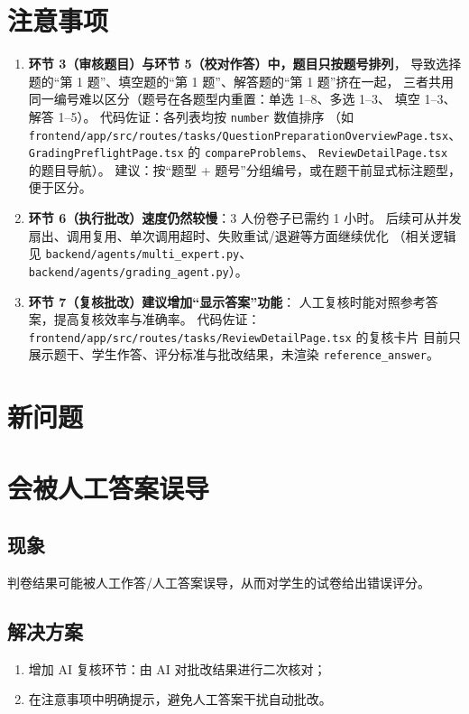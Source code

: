 \documentclass[12pt,a4paper]{ctexart}
\begin{document}
\section*{注意事项}

\begin{enumerate}[leftmargin=2em,label=\arabic*.]
  \item \textbf{环节 3（审核题目）与环节 5（校对作答）中，题目只按题号排列}，
        导致选择题的“第 1 题”、填空题的“第 1 题”、解答题的“第 1 题”挤在一起，
        三者共用同一编号难以区分（题号在各题型内重置：单选 1--8、多选 1--3、
        填空 1--3、解答 1--5）。
        代码佐证：各列表均按 \texttt{number} 数值排序
        （如 \texttt{frontend/app/src/routes/tasks/QuestionPreparationOverviewPage.tsx}、
        \texttt{GradingPreflightPage.tsx} 的 \texttt{compareProblems}、
        \texttt{ReviewDetailPage.tsx} 的题目导航）。
        建议：按“题型 + 题号”分组编号，或在题干前显式标注题型，便于区分。

  \item \textbf{环节 6（执行批改）速度仍然较慢}：3 人份卷子已需约 1 小时。
        后续可从并发扇出、调用复用、单次调用超时、失败重试/退避等方面继续优化
        （相关逻辑见 \texttt{backend/agents/multi\_expert.py}、
        \texttt{backend/agents/grading\_agent.py}）。

  \item \textbf{环节 7（复核批改）建议增加“显示答案”功能}：
        人工复核时能对照参考答案，提高复核效率与准确率。
        代码佐证：\texttt{frontend/app/src/routes/tasks/ReviewDetailPage.tsx} 的复核卡片
        目前只展示题干、学生作答、评分标准与批改结果，未渲染
        \texttt{reference\_answer}。
\end{enumerate}

\section*{新问题}

\section{会被人工答案误导}

\subsection{现象}
判卷结果可能被人工作答/人工答案误导，从而对学生的试卷给出错误评分。

\subsection{解决方案}
\begin{enumerate}[leftmargin=2em,label=(\arabic*)]
  \item 增加 AI 复核环节：由 AI 对批改结果进行二次核对；
  \item 在注意事项中明确提示，避免人工答案干扰自动批改。
\end{enumerate}
\end{document}
